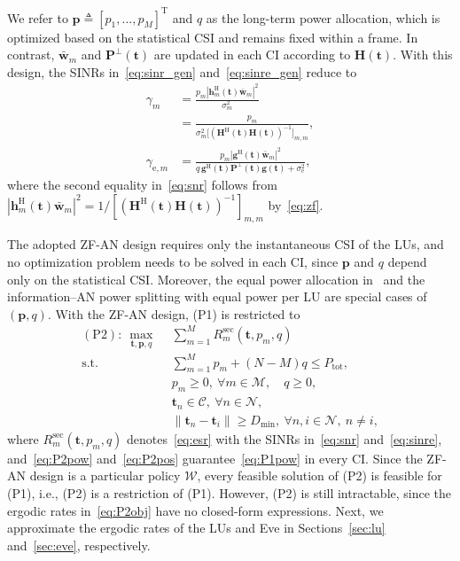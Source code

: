 \documentclass[journal]{IEEEtran}
\newcommand{\bt}{\mathbf{t}}
\newcommand{\bh}{\mathbf{h}}
\newcommand{\bg}{\mathbf{g}}
\newcommand{\bH}{\mathbf{H}}
\newcommand{\wb}{\bar{\mathbf{w}}}
\newcommand{\bp}{\mathbf{p}}
\newcommand{\Ptot}{P_{\mathrm{tot}}}
\newcommand{\Dmin}{D_{\mathrm{min}}}
\newcommand{\PHp}{\mathbf{P}^{\perp}(\bt)}
\begin{document}
We refer to $\bp\triangleq[p_1,\ldots,p_M]^{\mathrm{T}}$ and $q$ as the long-term power allocation, which is optimized based on the statistical CSI and remains fixed within a frame. In contrast, $\wb_m$ and $\PHp$ are updated in each CI according to $\bH(\bt)$. With this design, the SINRs in~\eqref{eq:sinr_gen} and~\eqref{eq:sinre_gen} reduce to
\begin{align}
\gamma_m&=\frac{p_m|\bh_m^{\mathrm{H}}(\bt)\wb_m|^2}{\sigma_m^2}
\nonumber\\
&=\frac{p_m}{\sigma_m^2
 \big[(\bH^{\mathrm{H}}(\bt)\bH(\bt))^{-1}\big]_{m,m}},
\label{eq:snr}\\
\gamma_{\mathrm{e},m}&=\frac{p_m|\bg^{\mathrm{H}}(\bt)\wb_m|^2}
 {q\,\bg^{\mathrm{H}}(\bt)\PHp\bg(\bt)+\sigma_{\mathrm{e}}^2},
\label{eq:sinre}
\end{align}
where the second equality in~\eqref{eq:snr} follows from $|\bh_m^{\mathrm{H}}(\bt)\wb_m|^2=1/[(\bH^{\mathrm{H}}(\bt)\bH(\bt))^{-1}]_{m,m}$ by~\eqref{eq:zf}.

The adopted ZF-AN design requires only the instantaneous CSI of the LUs, and no optimization problem needs to be solved in each CI, since $\bp$ and $q$ depend only on the statistical CSI. Moreover, the equal power allocation in~\cite{ZhengTCOM2025} and the information--AN power splitting with equal power per LU are special cases of $(\bp,q)$. With the ZF-AN design, (P1) is restricted to
\begin{subequations}\label{eq:P2}
\begin{align}
(\mathrm{P2}):\ \max_{\bt,\bp,q}\ \ & \sum_{m=1}^{M}R_m^{\mathrm{sec}}(\bt,p_m,q)\label{eq:P2obj}\\
\mathrm{s.t.}\ \ & \sum_{m=1}^{M}p_m+(N-M)q\le\Ptot,\label{eq:P2pow}\\
& p_m\ge0,\ \forall m\in\mathcal M,\quad q\ge0,\label{eq:P2pos}\\
& \bt_n\in\mathcal C,\ \forall n\in\mathcal N,\label{eq:P2region}\\
& \|\bt_n-\bt_i\|\ge\Dmin,\ \forall n,i\in\mathcal N,\ n\neq i,\label{eq:P2dist}
\end{align}
\end{subequations}
where $R_m^{\mathrm{sec}}(\bt,p_m,q)$ denotes~\eqref{eq:esr} with the SINRs in~\eqref{eq:snr} and~\eqref{eq:sinre}, and~\eqref{eq:P2pow} and~\eqref{eq:P2pos} guarantee~\eqref{eq:P1pow} in every CI. Since the ZF-AN design is a particular policy $\mathcal W$, every feasible solution of (P2) is feasible for (P1), i.e., (P2) is a restriction of (P1). However, (P2) is still intractable, since the ergodic rates in~\eqref{eq:P2obj} have no closed-form expressions. Next, we approximate the ergodic rates of the LUs and Eve in Sections~\ref{sec:lu} and~\ref{sec:eve}, respectively.
\end{document}
